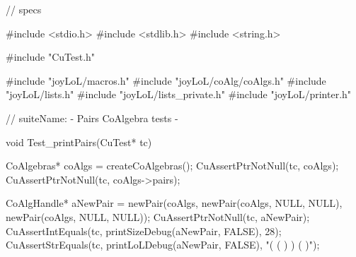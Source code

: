 \starttyping
// specs

#include <stdio.h>
#include <stdlib.h>
#include <string.h>

#include "CuTest.h"

#include "joyLoL/macros.h"
#include "joyLoL/coAlg/coAlgs.h"
#include "joyLoL/lists.h"
#include "joyLoL/lists_private.h"
#include "joyLoL/printer.h"

// suiteName: - Pairs CoAlgebra tests -

void Test_printPairs(CuTest* tc) {
  CoAlgebras* coAlgs = createCoAlgebras();
  CuAssertPtrNotNull(tc, coAlgs);
  CuAssertPtrNotNull(tc, coAlgs->pairs);

  CoAlgHandle* aNewPair = newPair(coAlgs,
                               newPair(coAlgs, NULL, NULL),
                               newPair(coAlgs, NULL, NULL));
  CuAssertPtrNotNull(tc, aNewPair);
  CuAssertIntEquals(tc, printSizeDebug(aNewPair, FALSE), 28);
  CuAssertStrEquals(tc, printLoLDebug(aNewPair, FALSE), "( ( ) ) ( )");
}
\stoptyping
